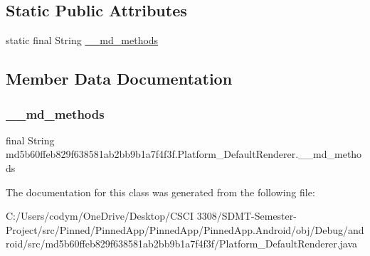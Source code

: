 \subsection*{Static Public Attributes}
\begin{DoxyCompactItemize}
\item 
static final String \hyperlink{classmd5b60ffeb829f638581ab2bb9b1a7f4f3f_1_1_platform___default_renderer_af4577cee8cad226436d0bce948786b98}{\+\_\+\+\_\+md\+\_\+methods}
\end{DoxyCompactItemize}


\subsection{Member Data Documentation}
\mbox{\label{classmd5b60ffeb829f638581ab2bb9b1a7f4f3f_1_1_platform___default_renderer_af4577cee8cad226436d0bce948786b98}} 
\subsubsection{\texorpdfstring{\+\_\+\+\_\+md\+\_\+methods}{\_\_md\_methods}}
{\footnotesize\ttfamily final String md5b60ffeb829f638581ab2bb9b1a7f4f3f.\+Platform\+\_\+\+Default\+Renderer.\+\_\+\+\_\+md\+\_\+methods\hspace{0.3cm}{\ttfamily [static]}}



The documentation for this class was generated from the following file\+:\begin{DoxyCompactItemize}
\item 
C\+:/\+Users/codym/\+One\+Drive/\+Desktop/\+C\+S\+C\+I 3308/\+S\+D\+M\+T-\/\+Semester-\/\+Project/src/\+Pinned/\+Pinned\+App/\+Pinned\+App/\+Pinned\+App.\+Android/obj/\+Debug/android/src/md5b60ffeb829f638581ab2bb9b1a7f4f3f/Platform\+\_\+\+Default\+Renderer.\+java\end{DoxyCompactItemize}
